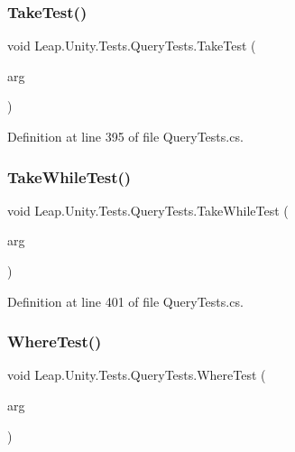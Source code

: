 \subsubsection{\texorpdfstring{TakeTest()}{TakeTest()}}
{\footnotesize\ttfamily void Leap.\+Unity.\+Tests.\+Query\+Tests.\+Take\+Test (\begin{DoxyParamCaption}\item[{\mbox{[}\+Value\+Source(\char`\"{}list0\char`\"{})\mbox{]} \mbox{\hyperlink{class_leap_1_1_unity_1_1_tests_1_1_query_tests_1_1_query_arg}{Query\+Arg}}}]{arg }\end{DoxyParamCaption})}



Definition at line 395 of file Query\+Tests.\+cs.

\mbox{\label{class_leap_1_1_unity_1_1_tests_1_1_query_tests_a8ed6ce829e8eaee9939300d6da3ead4e}} 
\subsubsection{\texorpdfstring{TakeWhileTest()}{TakeWhileTest()}}
{\footnotesize\ttfamily void Leap.\+Unity.\+Tests.\+Query\+Tests.\+Take\+While\+Test (\begin{DoxyParamCaption}\item[{\mbox{[}\+Value\+Source(\char`\"{}list0\char`\"{})\mbox{]} \mbox{\hyperlink{class_leap_1_1_unity_1_1_tests_1_1_query_tests_1_1_query_arg}{Query\+Arg}}}]{arg }\end{DoxyParamCaption})}



Definition at line 401 of file Query\+Tests.\+cs.

\mbox{\label{class_leap_1_1_unity_1_1_tests_1_1_query_tests_aa39732c88269e10d894ab1233a252215}} 
\subsubsection{\texorpdfstring{WhereTest()}{WhereTest()}}
{\footnotesize\ttfamily void Leap.\+Unity.\+Tests.\+Query\+Tests.\+Where\+Test (\begin{DoxyParamCaption}\item[{\mbox{[}\+Value\+Source(\char`\"{}list0\char`\"{})\mbox{]} \mbox{\hyperlink{class_leap_1_1_unity_1_1_tests_1_1_query_tests_1_1_query_arg}{Query\+Arg}}}]{arg }\end{DoxyParamCaption})}



